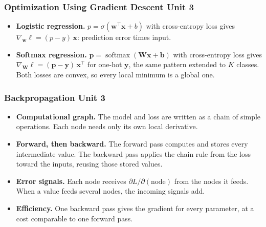 \documentclass[12pt]{beamer}
\newcommand{\FrameTitle}[2]{\frametitle{#1 \hfill \small\textnormal{\textcolor{midgray}{#2}}}}
\begin{document}
\begin{frame}\FrameTitle{Optimization Using Gradient Descent}{Unit 3}
    \begin{itemize}
        \item \textbf{Logistic regression.}
              $p = \sigma(\symbf{w}^\top\symbf{x} + b)$ with cross-entropy loss
              gives $\nabla_{\symbf{w}} \ell = (p - y)\,\symbf{x}$:
              prediction error times input.
        \item \textbf{Softmax regression.}
              $\symbf{p} = \operatorname{softmax}(\symbf{W}\symbf{x} + \symbf{b})$
              with cross-entropy loss gives
              $\nabla_{\symbf{W}} \ell = (\symbf{p} - \symbf{y})\,\symbf{x}^\top$
              for one-hot $\symbf{y}$, the same pattern extended to $K$ classes.
              Both losses are convex, so every local minimum is a global one.
    \end{itemize}
\end{frame}

\begin{frame}\FrameTitle{Backpropagation}{Unit 3}
    \begin{itemize}
        \item \textbf{Computational graph.} The model and loss are written as a
              chain of simple operations. Each node needs only its own local
              derivative.
        \item \textbf{Forward, then backward.} The forward pass computes and
              stores every intermediate value. The backward pass applies the
              chain rule from the loss toward the inputs, reusing those stored
              values.
        \item \textbf{Error signals.} Each node receives
              $\partial L/\partial(\text{node})$ from the nodes it feeds.
              When a value feeds several nodes, the incoming signals add.
        \item \textbf{Efficiency.} One backward pass gives the gradient for
              every parameter, at a cost comparable to one forward pass.
    \end{itemize}
\end{frame}
\end{document}
